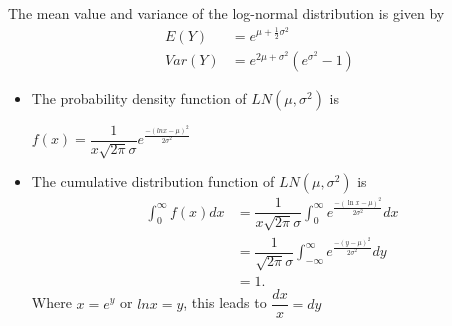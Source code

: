 \newpage
The mean value and variance of the log-normal distribution is given by
\begin{align}
	E(Y)&=e^{\mu+\frac{1}{2}\sigma^2} \label{eq2.3.1}\\
	Var(Y)&=e^{2\mu+\sigma^2}(e^{\sigma^2} - 1) \label{eq2.3.2}
\end{align}
\begin{itemize}
	\item The probability density function of $LN(\mu, \sigma^2)$ is 
	\begin{center}
		$f(x)=\dfrac{1}{x\sqrt{2\pi}\sigma}e^\frac{-(lnx-\mu)^2}{2\sigma^2}$
	\end{center}
	\item The cumulative distribution function of $LN(\mu, \sigma^2)$ is
	\begin{align*}
		\displaystyle \int_{0}^{\infty}f(x)dx&=\dfrac{1}{x\sqrt{2\pi}\sigma} \displaystyle \int_{0}^{\infty}e^\frac{-(\ln x-\mu)^2}{2\sigma^2}dx\\
		&=\dfrac{1}{\sqrt{2\pi}\sigma} \displaystyle \int_{-\infty}^{\infty}e^\frac{-(y-\mu)^2}{2\sigma^2}dy\\
		&=1.
	\end{align*}
Where	$x=e^y$ or $lnx=y$, this leads to $\dfrac{dx}{x} = dy$	   
\end{itemize}
